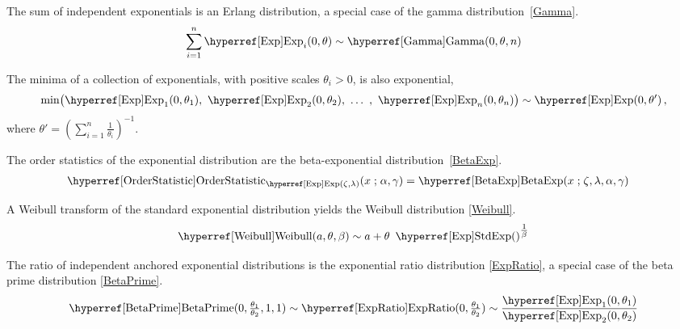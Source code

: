 The sum of independent exponentials is an Erlang distribution, a special case of the gamma distribution~\eqref{Gamma}.
\[
\sum_{i=1}^{n} \opr{Exp}_i(0,\theta) \sim \opr{Gamma}(0, \theta, n) \checked
\]


The minima of a collection of exponentials, with positive scales $\theta_i>0$, is  also exponential,
\[
\op{min}\bigl( \opr{Exp}_1(0,\theta_1),\ \opr{Exp}_2(0,\theta_2),\ \ldots\ ,\ \opr{Exp}_n(0,\theta_n) \bigr) \sim \opr{Exp}(0, \theta') \, , \checked
\]
where $\theta' = (\sum_{i=1}^{n} \tfrac{1}{\theta_i})^{-1}$. \checked


The order statistics  of the exponential distribution are the beta-exponential distribution~\eqref{BetaExp}.
\begin{align*}
\opr{OrderStatistic}&_{\opr{Exp}(\pLoc,\pScale)}  (x \given \alpha, \gamma) =  \opr{BetaExp}(x\given \pLoc, \pScale, \alpha, \gamma)  \checked
\end{align*}


A Weibull transform of the standard exponential distribution yields the Weibull distribution  \eqref{Weibull}.
\[
\opr{Weibull}(a,\theta,\beta) \sim a+ \theta\ \oprr{StdExp}{Exp}()^{\tfrac{1}{\beta}} \checked
\]


The ratio of independent anchored exponential distributions is the exponential ratio distribution \eqref{ExpRatio}, a special case of the beta prime distribution \eqref{BetaPrime}.
\label{sec:ExpRatio}
\[
\opr{BetaPrime}(0,\tfrac{\theta_1}{\theta_2} , 1,1) \sim \opr{ExpRatio}(0,\tfrac{\theta_1}{\theta_2}) \sim \frac{\opr{Exp}_1(0,\theta_1)}{\opr{Exp}_2(0,\theta_2) }
\]

